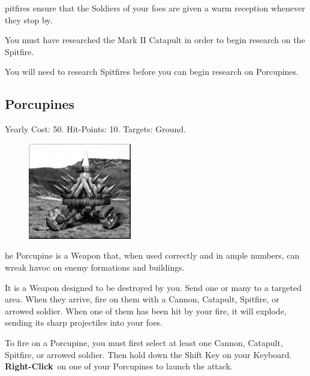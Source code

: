 pitfires ensure that the Soldiers of your foes are given a warm reception whenever they stop by.

You must have researched the Mark II Catapult in order to begin research on the Spitfire. 

You will need to research Spitfires before you can begin research on Porcupines.

\clearpage

\subsection{Porcupines}


\begin{center}
Yearly Cost: 50. Hit-Points: 10. Targets: Ground.
\end{center}

\begin{figure}
	\vspace{-20pt}
	\begin{center}
		\includegraphics[width=0.4\textwidth]{Aporcupine}
	\end{center}
\end{figure}

he Porcupine is a Weapon that, when used correctly and in ample numbers, can wreak havoc on enemy formations and buildings.

It is a Weapon designed to be destroyed by you. Send one or many to a targeted area. When they arrive, fire on them with a Cannon, Catapult, Spitfire, or arrowed soldier. When one of them has been hit by your fire, it will explode, sending its sharp projectiles into your foes.

To fire on a Porcupine, you must first select at least one Cannon, Catapult, Spitfire, or arrowed soldier. Then hold down the Shift Key on your Keyboard. \textbf{Right-Click} on one of your Porcupines to launch the attack.

